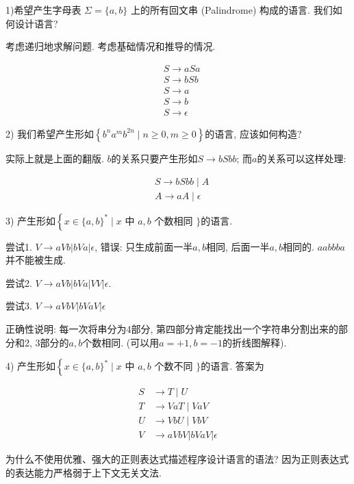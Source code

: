 \documentclass{ctexart}
\begin{document}
\begin{example}
    1)希望产生字母表 $\Sigma=\{a, b\}$ 上的所有回文串 (Palindrome) 构成的语言. 我们如何设计语言? 

    考虑递归地求解问题. 考虑基础情况和推导的情况. 

    $$\begin{aligned} & S \rightarrow a S a \\ & S \rightarrow b S b \\ & S \rightarrow a \\ & S \rightarrow b \\ & S \rightarrow \epsilon\end{aligned}$$

    2) 我们希望产生形如$\left\{b^n a^m b^{2 n} \mid n \geq 0, m \geq 0\right\}$的语言, 应该如何构造?

    实际上就是上面的翻版. $b$的关系只要产生形如$S\to bSbb$; 而$a$的关系可以这样处理: 

    $$\begin{aligned} & S \rightarrow {b S b b} \mid A \\ & A \rightarrow a A \mid \epsilon\end{aligned}$$

    3) 产生形如$\left\{x \in\{a, b\}^* \mid x\right.$ 中 $a, b$ 个数相同 $\}$的语言. 

    尝试1. $V \rightarrow a V b|b V a| \epsilon$, 错误: 只生成前面一半$a,b$相同, 后面一半$a,b$相同的. $aabbba$并不能被生成. 

    尝试2. $V \rightarrow a V b|b V a|VV| \epsilon$. 

     
    尝试3. $V \rightarrow a V b V|b V a V| \epsilon$

    正确性说明: 每一次将串分为4部分, 第四部分肯定能找出一个字符串分割出来的部分和2, 3部分的$a,b$个数相同. (可以用$a=+1, b=-1$的折线图解释). 

    4) 产生形如$\left\{x \in\{a, b\}^* \mid x\right.$ 中 $a, b$ 个数不同 $\}$的语言. 答案为

    $$
\begin{aligned}
S & \rightarrow T \mid U \\
T & \rightarrow V a T \mid V a V \\
U & \rightarrow V b U \mid V b V \\
V & \rightarrow a V b V|b V a V| \epsilon
\end{aligned}
$$

\end{example}

为什么不使用优雅、强大的正则表达式描述程序设计语言的语法? 因为正则表达式的表达能力严格弱于上下文无关文法. 
\end{document}
